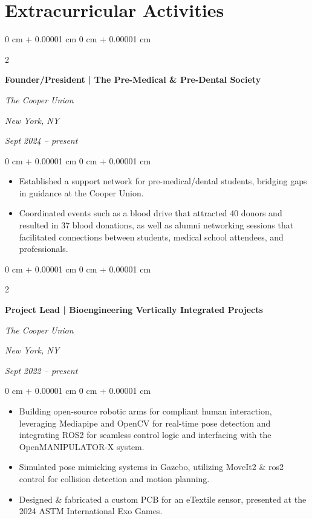 \documentclass[11pt, letterpaper]{article}
\newenvironment{highlights}{
    \begin{itemize}[
        topsep=0.1 cm,
        parsep=0.1 cm,
        partopsep=0pt,
        itemsep=0pt,
        leftmargin=0 cm + 10pt
    ]
}{
    \end{itemize}
} %
\newenvironment{onecolentry}{
    \begin{adjustwidth}{
        0 cm + 0.00001 cm
    }{
        0 cm + 0.00001 cm
    }
}{
    \end{adjustwidth}
} %
\newenvironment{twocolentry}[2][]{
    \onecolentry
    \def\secondColumn{#2}
    \setcolumnwidth{\fill, 4.5 cm}
    \begin{paracol}{2}
}{
    \switchcolumn \raggedleft \secondColumn
    \end{paracol}
    \endonecolentry
} %
\begin{document}
    
    \section{Extracurricular Activities}



        
        \begin{twocolentry}{
        \textit{New York, NY}    
            
        \textit{Sept 2024 – present}}
            \textbf{Founder/President | The Pre-Medical \& Pre-Dental Society}
            
            \textit{The Cooper Union}
        \end{twocolentry}

        \vspace{0.1 cm}
        \begin{onecolentry}
            \begin{highlights}
                \item Established a support network for pre-medical/dental students, bridging gaps in guidance at the Cooper Union.
                \item Coordinated events such as a blood drive that attracted 40 donors and resulted in 37 blood donations, as well as alumni networking sessions that facilitated connections between students, medical school attendees, and professionals.
            \end{highlights}
        \end{onecolentry}


        \vspace{0.15 cm}

        \begin{twocolentry}{
        \textit{New York, NY}    
            
        \textit{Sept 2022 – present}}
            \textbf{Project Lead | Bioengineering Vertically Integrated Projects}
            
            \textit{The Cooper Union}
        \end{twocolentry}

        \vspace{0.1 cm}
        \begin{onecolentry}
            \begin{highlights}
                \item Building open-source robotic arms for compliant human interaction, leveraging Mediapipe and OpenCV for real-time pose detection and integrating ROS2 for seamless control logic and interfacing with the OpenMANIPULATOR-X system.
                \item Simulated pose mimicking systems in Gazebo, utilizing MoveIt2 \& ros2 control for collision detection and motion planning.
                \item Designed \& fabricated a custom PCB for an eTextile sensor, presented at the 2024 ASTM International Exo Games.
            \end{highlights}
        \end{onecolentry}
\end{document}
